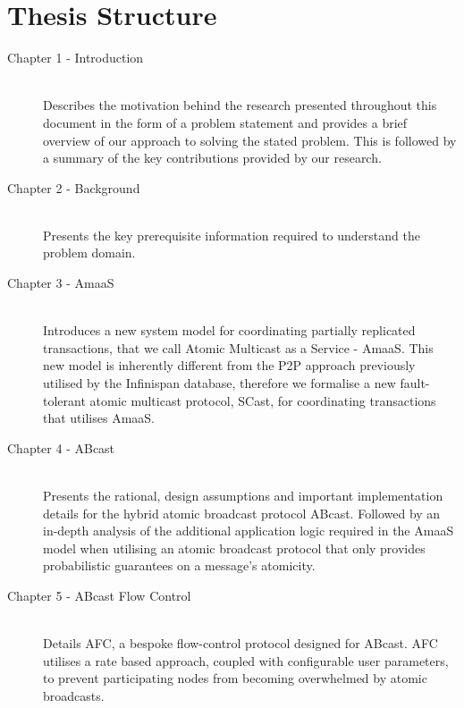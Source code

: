     \section{Thesis Structure}
         \begin{description}
             \item[Chapter 1 - Introduction] \hfill \\
             Describes the motivation behind the research presented throughout this document in the form of a problem statement and provides a brief overview of our approach to solving the stated problem.  This is followed by a summary of the key contributions provided by our research.  
             
             \item[Chapter 2 - Background] \hfill \\
             Presents the key prerequisite information required to understand the problem domain.  
             
             \item[Chapter 3 - AmaaS] \hfill \\
             Introduces a new system model for coordinating partially replicated transactions, that we call Atomic Multicast as a Service - \textsf{AmaaS}.  This new model is inherently different from the P2P approach previously utilised by the Infinispan database, therefore we formalise a new fault-tolerant atomic multicast protocol, \textsf{SCast}, for coordinating transactions that utilises \textsf{AmaaS}.  
             
             \item[Chapter 4 - ABcast] \hfill \\
              Presents the rational, design assumptions and important implementation details for the hybrid atomic broadcast protocol \textsf{ABcast}. Followed by an in-depth analysis of the additional application logic required in the \textsf{AmaaS} model when utilising an atomic broadcast protocol that only provides probabilistic guarantees on a message's atomicity.  
             
             \item[Chapter 5 - ABcast Flow Control] \hfill \\
             Details \textsf{AFC}, a bespoke flow-control protocol designed for \textsf{ABcast}.  \textsf{AFC} utilises a rate based approach, coupled with configurable user parameters, to prevent participating nodes from becoming overwhelmed by atomic broadcasts.  
             

\end{description}
